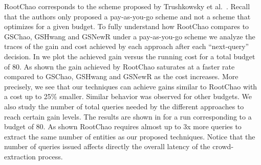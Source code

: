 RootChao corresponds to the scheme proposed by Trushkowsky et al.~\cite{trushkowsky:2013}. Recall that the authors only proposed a pay-as-you-go scheme and not a scheme that optimizes for a given budget. To fully understand how RootChao compares to GSChao, GSHwang and GSNewR under a pay-as-you-go scheme we analyze the traces of the gain and cost achieved by each approach after each ``next-query'' decision. In  we plot the achieved gain versus the running cost for a total budget of 80. As shown the gain achieved by RootChao saturates at a faster rate compared to GSChao, GSHwang and GSNewR as the cost increases. More precisely, we see that our techniques can achieve gains similar to RootChao with a cost up to 25\% smaller. Similar behavior was observed for other budgets. We also study the number of total queries needed by the different approaches to reach certain gain levels. The results are shown in  for a run corresponding to a budget of 80. As shown RootChao requires almost up to 3x more queries to extract the same number of entities as our proposed techniques. Notice that the number of queries issued affects directly the overall latency of the crowd-extraction process.

